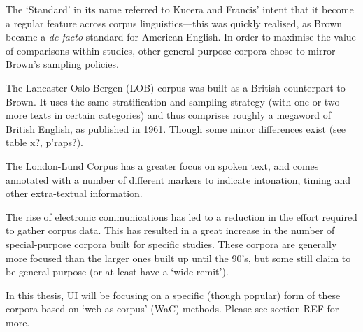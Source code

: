 The `Standard' in its name referred to Kucera and Francis' intent that it become a regular feature across corpus linguistics---this was quickly realised, as Brown became a \textsl{de facto} standard for American English.  In order to maximise the value of comparisons within studies, other general purpose corpora chose to mirror Brown's sampling policies.  


The Lancaster-Oslo-Bergen (LOB) corpus was built as a British counterpart to Brown.  %
It uses the same stratification and sampling strategy (with one or two more texts in certain categories) and thus comprises roughly a megaword of British English, as published in 1961.  %
Though some minor differences exist (see table x?, p'raps?).


The London-Lund Corpus %
has a greater focus on spoken text, and comes annotated with a number of different markers to indicate intonation, timing and other extra-textual information.  




\til{ }

The rise of electronic communications has led to a reduction in the effort required to gather corpus data.  This has resulted in a great increase in the number of special-purpose corpora built for specific studies.  These corpora are generally more focused than the larger ones built up until the 90's, but some still claim to be general purpose (or at least have a `wide remit').  


In this thesis, UI will be focusing on a specific (though popular) form of these corpora based on `web-as-corpus' (WaC) methods.  Please see section REF for more.




